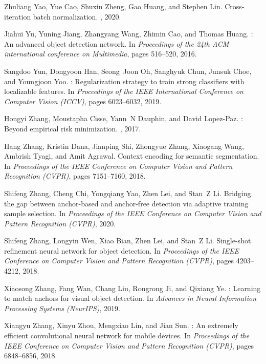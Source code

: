 \documentclass[10pt,twocolumn,letterpaper]{article}
\begin{document}
{\begin{thebibliography}{100}
	Zhuliang Yao, Yue Cao, Shuxin Zheng, Gao Huang, and Stephen Lin.
	\newblock Cross-iteration batch normalization.
	, 2020.
	
	Jiahui Yu, Yuning Jiang, Zhangyang Wang, Zhimin Cao, and Thomas Huang.
	: An advanced object detection network.
	\newblock In {\em Proceedings of the 24th ACM international conference on
		Multimedia}, pages 516--520, 2016.
	
	Sangdoo Yun, Dongyoon Han, Seong~Joon Oh, Sanghyuk Chun, Junsuk Choe, and
	Youngjoon Yoo.
	: Regularization strategy to train strong classifiers with
	localizable features.
	\newblock In {\em Proceedings of the IEEE International Conference on Computer
		Vision (ICCV)}, pages 6023--6032, 2019.
	
	Hongyi Zhang, Moustapha Cisse, Yann~N Dauphin, and David Lopez-Paz.
	: Beyond empirical risk minimization.
	, 2017.
	
	Hang Zhang, Kristin Dana, Jianping Shi, Zhongyue Zhang, Xiaogang Wang, Ambrish
	Tyagi, and Amit Agrawal.
	\newblock Context encoding for semantic segmentation.
	\newblock In {\em Proceedings of the IEEE Conference on Computer Vision and
		Pattern Recognition (CVPR)}, pages 7151--7160, 2018.
	
	Shifeng Zhang, Cheng Chi, Yongqiang Yao, Zhen Lei, and Stan~Z Li.
	\newblock Bridging the gap between anchor-based and anchor-free detection via
	adaptive training sample selection.
	\newblock In {\em Proceedings of the IEEE Conference on Computer Vision and
		Pattern Recognition (CVPR)}, 2020.
	
	Shifeng Zhang, Longyin Wen, Xiao Bian, Zhen Lei, and Stan~Z Li.
	\newblock Single-shot refinement neural network for object detection.
	\newblock In {\em Proceedings of the IEEE Conference on Computer Vision and
		Pattern Recognition (CVPR)}, pages 4203--4212, 2018.
	
	Xiaosong Zhang, Fang Wan, Chang Liu, Rongrong Ji, and Qixiang Ye.
	: Learning to match anchors for visual object detection.
	\newblock In {\em Advances in Neural Information Processing Systems (NeurIPS)},
	2019.
	
	Xiangyu Zhang, Xinyu Zhou, Mengxiao Lin, and Jian Sun.
	: An extremely efficient convolutional neural network for
	mobile devices.
	\newblock In {\em Proceedings of the IEEE Conference on Computer Vision and
		Pattern Recognition (CVPR)}, pages 6848--6856, 2018.
	

\end{thebibliography}}
\end{document}
